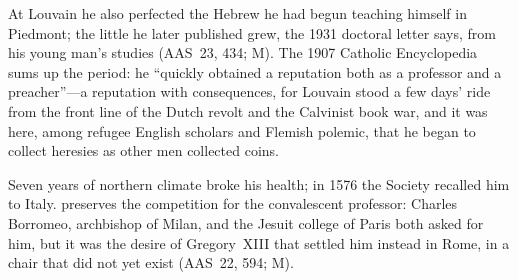 At Louvain he also perfected the Hebrew he had begun teaching
himself in Piedmont; the little  he later published grew, the 1931 doctoral letter says,
from his young man's studies (AAS~23, 434; M). The 1907 Catholic
Encyclopedia sums up the period: he ``quickly obtained a reputation
both as a professor and a preacher''---a reputation with
consequences, for Louvain stood a few days' ride from the front
line of the Dutch revolt and the Calvinist book war, and it was
here, among refugee English scholars and Flemish polemic, that he
began to collect heresies as other men collected coins.

Seven years of northern climate broke his health; in 1576 the
Society recalled him to Italy.  preserves the
competition for the convalescent professor: Charles Borromeo,
archbishop of Milan, and the Jesuit college of Paris both asked for
him, but it was the desire of Gregory~XIII that settled him instead
in Rome, in a chair that did not yet exist (AAS~22, 594; M).
